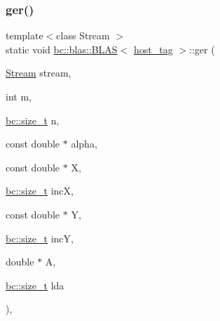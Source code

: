\subsubsection{\texorpdfstring{ger()}{ger()}\hspace{0.1cm}{\footnotesize\ttfamily [1/2]}}
{\footnotesize\ttfamily template$<$class Stream $>$ \\
static void \hyperlink{structbc_1_1blas_1_1BLAS}{bc\+::blas\+::\+B\+L\+AS}$<$ \hyperlink{structbc_1_1host__tag}{host\+\_\+tag} $>$\+::ger (\begin{DoxyParamCaption}\item[{\hyperlink{classbc_1_1streams_1_1Stream}{Stream}}]{stream,  }\item[{int}]{m,  }\item[{\hyperlink{namespacebc_aaf8e3fbf99b04b1b57c4f80c6f55d3c5}{bc\+::size\+\_\+t}}]{n,  }\item[{const double $\ast$}]{alpha,  }\item[{const double $\ast$}]{X,  }\item[{\hyperlink{namespacebc_aaf8e3fbf99b04b1b57c4f80c6f55d3c5}{bc\+::size\+\_\+t}}]{incX,  }\item[{const double $\ast$}]{Y,  }\item[{\hyperlink{namespacebc_aaf8e3fbf99b04b1b57c4f80c6f55d3c5}{bc\+::size\+\_\+t}}]{incY,  }\item[{double $\ast$}]{A,  }\item[{\hyperlink{namespacebc_aaf8e3fbf99b04b1b57c4f80c6f55d3c5}{bc\+::size\+\_\+t}}]{lda }\end{DoxyParamCaption})\hspace{0.3cm}{\ttfamily [inline]}, {\ttfamily [static]}}

\mbox{\label{structbc_1_1blas_1_1BLAS_3_01host__tag_01_4_ace9dcdd952c9215795acd4fda5188636}} 
